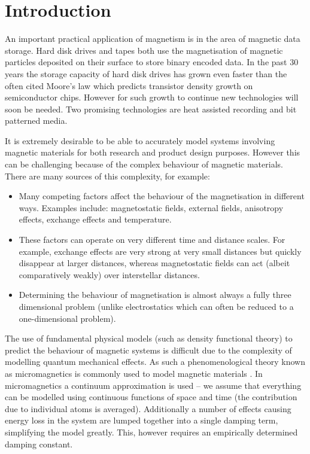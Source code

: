 
\chapter{Introduction}
\label{sec:introduction}

An important practical application of magnetism is in the area of magnetic data storage. Hard disk drives and tapes both use the magnetisation of magnetic particles deposited on their surface to store binary encoded data. In the past 30 years the storage capacity of hard disk drives has grown even faster than the often cited Moore's law which predicts transistor density growth on semiconductor chips. \cite{McDaniel2005} However for such growth to continue new technologies will soon be needed. %
Two promising technologies are heat assisted recording and bit patterned media.

It is extremely desirable to be able to accurately model systems involving magnetic materials for both research and product design purposes. However this can be challenging because of the complex behaviour of magnetic materials. There are many sources of this complexity, for example:
\begin{itemize}
\item Many competing factors affect the behaviour of the magnetisation in different ways. Examples include: magnetostatic fields, external fields, anisotropy effects, exchange effects and temperature.

\item These factors can operate on very different time and distance scales. For example, exchange effects are very strong at very small distances but quickly disappear at larger distances, whereas magnetostatic fields can act (albeit comparatively weakly) over interstellar distances.

\item Determining the behaviour of magnetisation is almost always a fully three dimensional problem (unlike electrostatics which can often be reduced to a one-dimensional problem).
\end{itemize}

The use of fundamental physical models (such as density functional theory) to predict the behaviour of magnetic systems is difficult due to the complexity of modelling quantum mechanical effects. As such a phenomenological theory known as micromagnetics is commonly used to model magnetic materials \cite{Coey2010} \cite{Kronmuller2003}. In micromagnetics a continuum approximation is used -- we assume that everything can be modelled using continuous functions of space and time (the contribution due to individual atoms is averaged). Additionally a number of effects causing energy loss in the system are lumped together into a single damping term, simplifying the model greatly. This, however requires an empirically determined damping constant.

